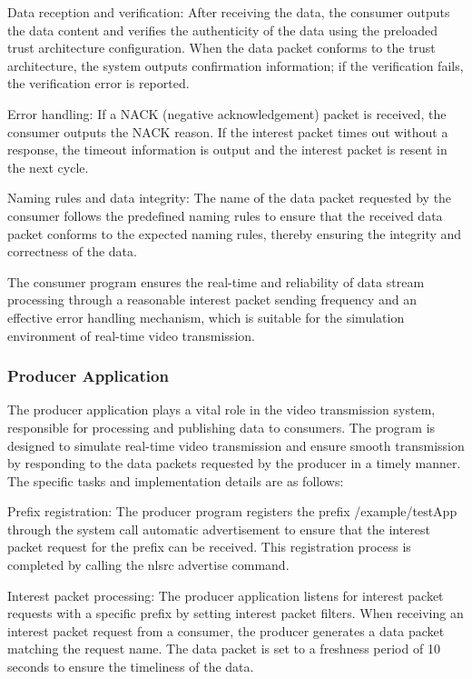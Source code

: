 \documentclass[conference]{IEEEtran}
\begin{document}
Data reception and verification: After receiving the data, the consumer outputs the data content and verifies the authenticity of the data using the preloaded trust architecture configuration. When the data packet conforms to the trust architecture, the system outputs confirmation information; if the verification fails, the verification error is reported.

Error handling: If a NACK (negative acknowledgement) packet is received, the consumer outputs the NACK reason. If the interest packet times out without a response, the timeout information is output and the interest packet is resent in the next cycle.

Naming rules and data integrity: The name of the data packet requested by the consumer follows the predefined naming rules to ensure that the received data packet conforms to the expected naming rules, thereby ensuring the integrity and correctness of the data.

The consumer program ensures the real-time and reliability of data stream processing through a reasonable interest packet sending frequency and an effective error handling mechanism, which is suitable for the simulation environment of real-time video transmission.

\subsubsection{Producer Application}
The producer application plays a vital role in the video transmission system, responsible for processing and publishing data to consumers. The program is designed to simulate real-time video transmission and ensure smooth transmission by responding to the data packets requested by the producer in a timely manner. The specific tasks and implementation details are as follows:

Prefix registration: The producer program registers the prefix /example/testApp through the system call automatic advertisement to ensure that the interest packet request for the prefix can be received. This registration process is completed by calling the nlsrc advertise command.

Interest packet processing: The producer application listens for interest packet requests with a specific prefix by setting interest packet filters. When receiving an interest packet request from a consumer, the producer generates a data packet matching the request name. The data packet is set to a freshness period of 10 seconds to ensure the timeliness of the data.
\end{document}
